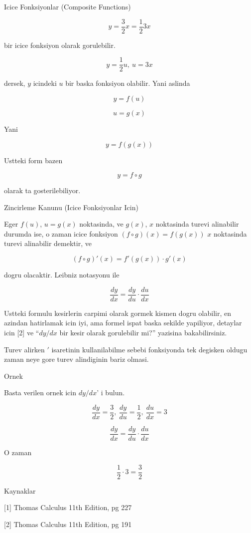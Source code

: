 \documentclass[12pt,fleqn]{article}\usepackage{../common}
\begin{document}
Icice Fonksiyonlar (Composite Functions)

\[ y = \frac{3}{2}x = \frac{1}{2}3x \]

bir icice fonksiyon olarak gorulebilir. 

\[ y = \frac{1}{2}u, \ u=3x \]

dersek, $y$ icindeki $u$ bir baska fonksiyon olabilir. Yani aslinda 

\[ y = f(u) \]

\[ u = g(x) \]

Yani

\[ y = f(g(x)) \]

Ustteki form bazen 

\[ y = f \circ g \]

olarak ta gosterilebiliyor. 

Zincirleme Kanunu (Icice Fonksiyonlar Icin)

Eger $f(u)$, $u=g(x)$ noktasinda, ve $g(x)$, $x$ noktasinda turevi
alinabilir durumda ise, o zaman icice fonksiyon $(f \circ g)(x) = f(g(x))$
$x$ noktasinda turevi alinabilir demektir, ve

\[ (f \circ g)'(x) = f'(g(x)) \cdot g'(x) \]

dogru olacaktir. Leibniz notasyonu ile 

\[ \frac{ dy}{dx} = \frac{ dy}{du} \cdot \frac{ du}{dx} \]

Ustteki formulu kesirlerin carpimi olarak gormek kismen dogru olabilir, en
azindan hatirlamak icin iyi, ama formel ispat baska sekilde yapiliyor,
detaylar icin [2] ve ``$dy/dx$ bir kesir olarak gorulebilir mi?'' yazisina
bakabilirsiniz.

Turev alirken $'$ isaretinin kullanilabilme sebebi fonksiyonda tek degisken
oldugu zaman neye gore turev alindiginin bariz olmasi.

Ornek 

Basta verilen ornek icin $dy/dx$' i bulun. 

\[ \frac{ dy}{dx} = \frac{ 3}{2}, \
\frac{dy}{du} = \frac{ 1}{2}, \
\frac{ du}{dx} = 3
 \]

\[ \frac{ dy}{dx} = \frac{ dy}{du} \cdot \frac{ du}{dx} \]

O zaman 

\[ \frac{ 1}{2} \cdot 3 = \frac{ 3}{2} \]


Kaynaklar 

[1] Thomas Calculus 11th Edition, pg 227

[2] Thomas Calculus 11th Edition, pg 191
\end{document}
